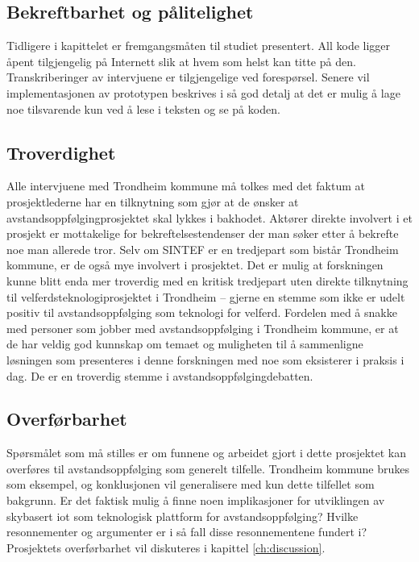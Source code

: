 \subsection{Bekreftbarhet og pålitelighet}
Tidligere i kapittelet er fremgangsmåten til studiet presentert. All kode ligger åpent tilgjengelig på Internett slik at hvem som helst kan
titte på den. Transkriberinger av intervjuene er tilgjengelige ved forespørsel. Senere vil implementasjonen av prototypen beskrives i
så god detalj at det er mulig å lage noe tilsvarende kun ved å lese i teksten og se på koden.

\subsection{Troverdighet}
Alle intervjuene med Trondheim kommune må tolkes med det faktum at prosjektlederne har en tilknytning som
gjør at de ønsker at avstandsoppfølgingprosjektet
skal lykkes i bakhodet. Aktører direkte involvert i et prosjekt er mottakelige for bekreftelsestendenser der man søker etter å bekrefte noe
man allerede tror. Selv om SINTEF er en tredjepart som bistår Trondheim kommune, er de også mye involvert i prosjektet.
Det er mulig at forskningen kunne blitt enda mer troverdig med en kritisk tredjepart uten direkte tilknytning til velferdsteknologiprosjektet i Trondheim --
gjerne en stemme som ikke er udelt positiv til avstandsoppfølging som teknologi for velferd.
Fordelen med å snakke med personer som jobber med avstandsoppfølging i Trondheim kommune, er at de har veldig god kunnskap om temaet
og muligheten til å sammenligne løsningen som presenteres i denne forskningen med noe som eksisterer i praksis i dag.
De er en troverdig stemme i avstandsoppfølgingdebatten.

\subsection{Overførbarhet}
Spørsmålet som må stilles er om funnene og arbeidet gjort i dette prosjektet kan overføres til avstandsoppfølging som generelt tilfelle.
Trondheim kommune brukes som eksempel, og konklusjonen vil generalisere med kun dette tilfellet som bakgrunn.
Er det faktisk mulig å finne noen implikasjoner for utviklingen av skybasert \gls{iot} som teknologisk plattform for avstandsoppfølging?
Hvilke resonnementer og argumenter er i så fall disse resonnementene fundert i? Prosjektets overførbarhet vil diskuteres i
kapittel \ref{ch:discussion}.


